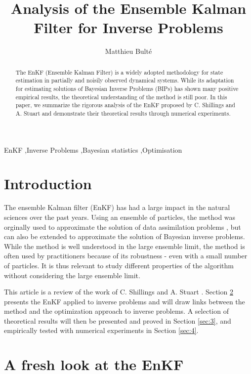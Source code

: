 \documentclass[a4paper,5p]{elsarticle}
\begin{document}
\begin{frontmatter}

\title{Analysis of the Ensemble Kalman Filter for Inverse Problems}
\author{Matthieu Bulté}
\address{Technische Universität München}

\begin{abstract}
The EnKF (Ensemble Kalman Filter) is a widely adopted methodology
for state estimation in partially and noisily observed dynamical systems. While
its adaptation for estimating solutions of Bayesian Inverse Problems (BIPs)
has shown many positive empirical results, the theoretical understanding of
the method is still poor. In this paper, we summarize the rigorous analysis of
the EnKF proposed by C. Shillings and A. Stuart \cite{schillings2017analysis} and demonstrate their
theoretical results through numerical experiments.
\end{abstract}
\begin{keyword}
EnKF \sep Inverse Problems \sep Bayesian statistics \sep Optimisation
\end{keyword}
\end{frontmatter}

\section{Introduction} \label{sec:1} 
The ensemble Kalman filter (EnKF) has had a large impact in the
natural sciences over the past years. Using an ensemble of particles,
the method was orginally used to approximate the solution of data
assimilation problems \cite{iglesias2013ensemble}, but can also be extended to approximate
the solution of Bayesian inverse problems. While the method is well understood
in the large ensemble limit, the method is often used
by practitioners because of its robustness - even with a small number
of particles. It is thus relevant to study different properties of the
algorithm without considering the large ensemble limit.

This article is a review of the work of C. Shillings and A. Stuart \cite{schillings2017analysis}.
Section \ref{sec:2} presents the EnKF applied to inverse problems and will draw links
between the method and the optimization approach to inverse problems. A selection of theoretical
results will then be presented and proved in Section \ref{sec:3}, and empirically tested with numerical
experiments in Section \ref{sec:4}.

\section{A fresh look at the EnKF} \label{sec:2}
\end{document}
